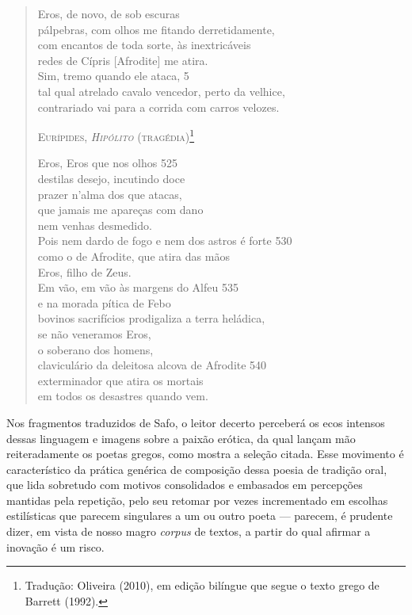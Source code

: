\begin{quote}
\smallskip

Eros, de novo, de sob escuras\\
pálpebras, com olhos me fitando derretidamente,\\ %
com encantos de toda sorte, às inextricáveis\\
redes de Cípris \textup{[Afrodite]} me atira.\\ %
Sim, tremo quando ele ataca, \num{5}\\
tal qual atrelado cavalo vencedor, perto da velhice,\\
contrariado vai para a corrida com carros velozes.

\bigskip

{\centering
\textsc{Eurípides, \textit{Hipólito} (tragédia)}\footnote{ Tradução: Oliveira (2010), em
edição bilíngue que segue o texto grego de Barrett (1992).}
\par}

\smallskip

Eros, Eros que nos olhos \num{525}\\
destilas desejo, incutindo doce\\ 
prazer n’alma dos que atacas,\\
que jamais me apareças com dano\\
nem venhas desmedido.\\
Pois nem dardo de fogo e nem dos astros é forte \num{530}\\
como o de Afrodite, que atira das mãos\\
Eros, filho de Zeus.\\
Em vão, em vão às margens do Alfeu \num{535}\\
e na morada pítica de Febo\\
bovinos sacrifícios prodigaliza a terra heládica,\\
se não veneramos Eros,\\
o soberano dos homens,\\
claviculário da deleitosa alcova de Afrodite \num{540}\\
exterminador que atira os mortais\\
em todos os desastres quando vem.
\end{quote}

Nos fragmentos traduzidos de Safo, o leitor decerto perceberá os ecos intensos
dessas linguagem e imagens sobre a paixão erótica, da qual lançam mão
reiteradamente os poetas gregos, como mostra a seleção citada. Esse movimento é
característico da prática genérica de composição dessa poesia de tradição oral, que lida sobretudo com motivos consolidados e embasados em
percepções mantidas pela repetição, pelo seu retomar por vezes incrementado em
escolhas estilísticas que parecem singulares a um ou outro poeta --- parecem, é
prudente dizer, em vista de nosso magro \textit{corpus} de textos, a partir do
qual afirmar a inovação é um risco.

